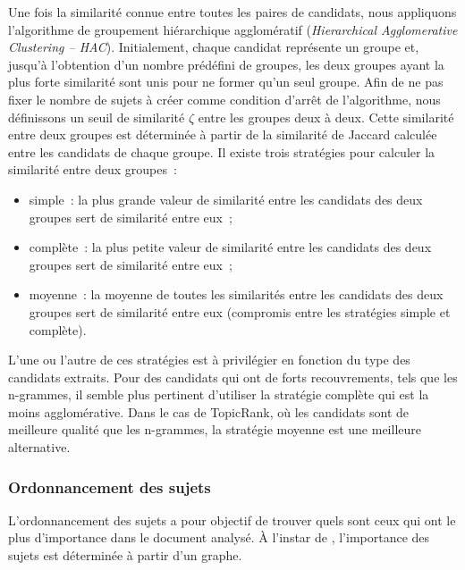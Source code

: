         Une fois la similarité connue entre toutes les paires de candidats, nous
        appliquons l'algorithme de groupement hiérarchique agglomératif
        (\textit{Hierarchical Agglomerative Clustering -- HAC}). Initialement,
        chaque candidat représente un groupe et, jusqu'à l'obtention d'un nombre
        prédéfini de groupes, les deux groupes ayant la plus forte similarité
        sont unis pour ne former qu'un seul groupe. Afin de ne pas fixer le
        nombre de sujets à créer comme condition d'arrêt de l'algorithme, nous
        définissons un seuil de similarité $\zeta$ entre les groupes deux à
        deux. Cette similarité entre deux groupes est déterminée à partir de la
        similarité de Jaccard calculée entre les candidats de chaque groupe. Il
        existe trois stratégies pour calculer la similarité entre deux groupes~:
        \begin{itemize}
          \item{simple~: la plus grande valeur de similarité entre les candidats
                des deux groupes sert de similarité entre eux~;}
          \item{complète~: la plus petite valeur de similarité entre les
                candidats des deux groupes sert de similarité entre eux~;}
          \item{moyenne~: la moyenne de toutes les similarités entre les
                candidats des deux groupes sert de similarité entre eux
                (compromis entre les stratégies simple et complète).}
        \end{itemize}
        L'une ou l'autre de ces stratégies est à privilégier en fonction du type
        des candidats extraits. Pour des candidats qui ont de forts
        recouvrements, tels que les n-grammes, il semble plus pertinent
        d'utiliser la stratégie complète qui est la moins agglomérative. Dans le
        cas de TopicRank, où les candidats sont de meilleure qualité que les
        n-grammes, la stratégie moyenne est une meilleure alternative.

      \subsubsection{Ordonnancement des sujets}
      \label{subsubsec:main-automatic_keyphrase_annotation-unsupervised_automatic_keyphrase_extraction-topicrank-topic_ranking}
        L'ordonnancement des sujets a pour objectif de trouver quels sont ceux
        qui ont le plus d'importance dans le document analysé. À l'instar de
        , l'importance des sujets est déterminée à
        partir d'un graphe.

